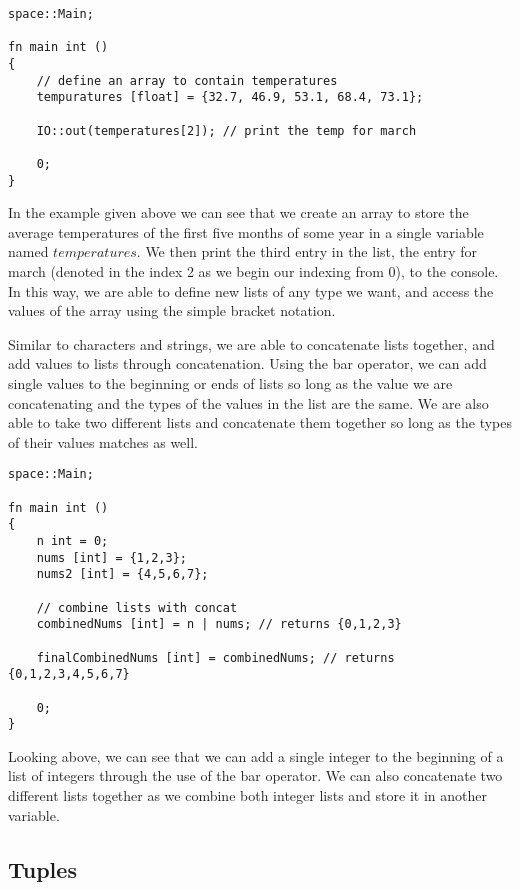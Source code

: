 \documentclass{article}
\begin{document}
\begin{lstlisting}
space::Main;

fn main int ()
{
	// define an array to contain temperatures
	tempuratures [float] = {32.7, 46.9, 53.1, 68.4, 73.1};

	IO::out(temperatures[2]); // print the temp for march

	0;
}
\end{lstlisting}

In the example given above we can see that we create an array to store the average temperatures of the first five months of some year in a single variable named $temperatures$.
We then print the third entry in the list, the entry for march (denoted in the index 2 as we begin our indexing from 0), to the console. In this way, we are able to define
new lists of any type we want, and access the values of the array using the simple bracket notation.

Similar to characters and strings, we are able to concatenate lists together, and add values to lists through concatenation. Using the bar operator, we can add single
values to the beginning or ends of lists so long as the value we are concatenating and the types of the values in the list are the same. We are also able to take two
different lists and concatenate them together so long as the types of their values matches as well.

\begin{lstlisting}
space::Main;

fn main int ()
{
	n int = 0;
	nums [int] = {1,2,3};
	nums2 [int] = {4,5,6,7};

	// combine lists with concat
	combinedNums [int] = n | nums; // returns {0,1,2,3}

	finalCombinedNums [int] = combinedNums; // returns {0,1,2,3,4,5,6,7}

	0;
}
\end{lstlisting}

Looking above, we can see that we can add a single integer to the beginning of a list of integers through the use of the bar operator. We can also concatenate two
different lists together as we combine both integer lists and store it in another variable.


\subsection{Tuples}
\end{document}
